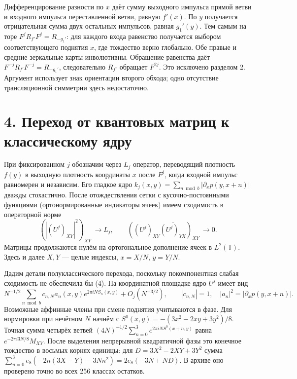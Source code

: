 \documentclass[11pt,a4paper]{article}
\newcommand{\sect}[1]{\section*{\sffamily\color{ink}#1}}
\newcommand{\T}{\mathbb T}
\begin{document}
Дифференцирование разности по $x$ даёт сумму выходного импульса прямой ветви и входного импульса переставленной ветви, равную $f'(x)$. По $y$ получается отрицательная сумма двух остальных импульсов, равная $g_1'(y)$. Тем самым на торе $F^j R_{f'} F^j=R_{-g_1'}$: для каждого входа равенство получается выбором соответствующего поднятия $x$, где тождество верно глобально. Обе правые и средние зеркальные карты инволютивны. Обращение равенства даёт $F^{-j}R_{f'}F^{-j}=R_{-g_1'}$, следовательно $R_{f'}$ обращает $F^{2j}$. Это исключено разделом 2. Аргумент использует знак ориентации второго обхода; одно отсутствие трансляционной симметрии здесь недостаточно.
\newpage
\sect{4. Переход от квантовых матриц к классическому ядру}
При фиксированном $j$ обозначим через $L_j$ оператор, переводящий плотность $f(y)$ в выходную плотность координаты $x$ после $F^j$, когда входной импульс равномерен и независим. Его гладкое ядро $k_j(x,y)=\sum_{n\bmod b}|\partial_xp(y,x+n)|$ дважды стохастично. После отождествления сетки с кусочно-постоянными функциями (ортонормированные индикаторы ячеек) имеем сходимость в операторной норме
\[
  (|(U^j)_{XY}|^2)_{XY}\ \longrightarrow L_j,\qquad
  ((U^j)_{XY}\overline{(U^j)_{YX}})_{XY}\ \longrightarrow0 .               \tag{4}
\]
Матрицы продолжаются нулём на ортогональное дополнение ячеек в $L^2(\T)$. Здесь и далее $X,Y$ --- целые индексы, $x=X/N$, $y=Y/N$.

Дадим детали полуклассического перехода, поскольку покомпонентная слабая сходимость не обеспечила бы (4). На координатной площадке ядро $U^j$ имеет вид
\[
 N^{-1/2}\sum_{n\bmod b}c_{n,N} a_n(x,y)e^{2\pi iN S_n(x,y)}
                   +O_j(N^{-3/2}),\qquad
 |c_{n,N}|=1,\quad |a_n|^2=|\partial_xp(y,x+n)|.                          \tag{5}
\]
Возможные аффинные члены при смене поднятия учитываются в фазе. Для нормировки при нечётном $N$ начнём с $S^0(x,y)=-(3x^2-2xy+3y^2)/8$. Точная сумма четырёх ветвей $(4N)^{-1/2}\sum_{n=0}^3e^{2\pi iN S^0(x+n,y)}$ равна $e^{-2\pi i3N/8}M_{XY}$. После выделения непрерывной квадратичной фазы это конечное тождество в восьмых корнях единицы: для $D=3X^2-2XY+3Y^2$ сумма $\sum_{n=0}^3e_8(-2n(3X-Y)-3Nn^2)=2e_8(-3N+ND)$. В архиве оно проверено точно во всех 256 классах остатков.
\end{document}
